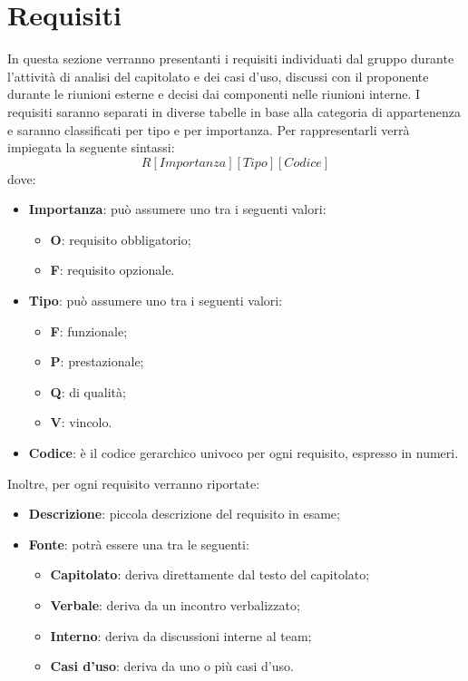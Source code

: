 \documentclass[../AnalisiDeiRequisiti_v3.0.0.tex]{subfiles}
\begin{document}
\section{Requisiti}
In questa sezione verranno presentanti i requisiti individuati dal gruppo durante l'attività di analisi del capitolato e dei casi d'uso, discussi con il proponente durante le riunioni esterne e decisi dai componenti nelle riunioni interne. I requisiti saranno separati in diverse tabelle in base alla categoria di appartenenza e saranno classificati per tipo e per importanza. Per rappresentarli verrà impiegata la seguente sintassi:
\begin{equation*}
	R[Importanza][Tipo][Codice]
\end{equation*}
dove:
\begin{itemize}
	\item \textbf{Importanza}: può assumere uno tra i seguenti valori:
	\begin{itemize}
		\item \textbf{O}: requisito obbligatorio;
		\item \textbf{F}: requisito opzionale.
	\end{itemize}
	\item \textbf{Tipo}: può assumere uno tra i seguenti valori:
	\begin{itemize}
		\item \textbf{F}: funzionale;
		\item \textbf{P}: prestazionale;
		\item \textbf{Q}: di qualità;
		\item \textbf{V}: vincolo.
	\end{itemize}	
	\item \textbf{Codice}: è il codice gerarchico univoco per ogni requisito, espresso in numeri.
\end{itemize}
Inoltre, per ogni requisito verranno riportate:
\begin{itemize}
	\item \textbf{Descrizione}: piccola descrizione del requisito in esame;
	\item \textbf{Fonte}: potrà essere una tra le seguenti:
	\begin{itemize}
		\item \textbf{Capitolato}: deriva direttamente dal testo del capitolato; 
		\item \textbf{Verbale}: deriva da un incontro verbalizzato;
		\item \textbf{Interno}: deriva da discussioni interne al team;
		\item \textbf{Casi d'uso}: deriva da uno o più casi d'uso.
	\end{itemize}
\end{itemize}
	
\end{document}
